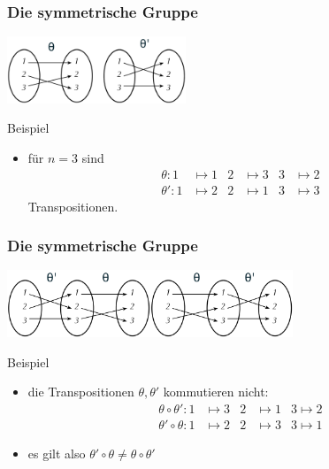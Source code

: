 \documentclass{beamer}
\newcommand{\ue}{\"u}
\begin{document}
\begin{frame}\frametitle{Die symmetrische Gruppe}
	\hfill\includegraphics[height=20mm]{pics/transpositions3.pdf}
	\begin{block}{Beispiel}
		\begin{itemize}
			\item f\ue r $n=3$ sind
				\begin{align*}
					\theta:1&\mapsto1&2&\mapsto3&3&\mapsto2\\
					\theta':1&\mapsto2&2&\mapsto1&3&\mapsto3
				\end{align*}
				Transpositionen.
		\end{itemize}
	\end{block}
\end{frame}

\begin{frame}\frametitle{Die symmetrische Gruppe}
	\hfill\includegraphics[height=20mm]{pics/transpositions.pdf}\hfill\includegraphics[height=20mm]{pics/transpositions2.pdf}
	\begin{block}{Beispiel}
		\begin{itemize}
			\item die Transpositionen $\theta,\theta'$ kommutieren nicht:
				\begin{align*}
					\theta\circ\theta':1&\mapsto3&2&\mapsto1&3\mapsto2\\
					\theta'\circ\theta:1&\mapsto2&2&\mapsto3&3\mapsto1
				\end{align*}
			\item es gilt also $\theta'\circ\theta\neq\theta\circ\theta'$
		\end{itemize}
	\end{block}
\end{frame}
\end{document}
